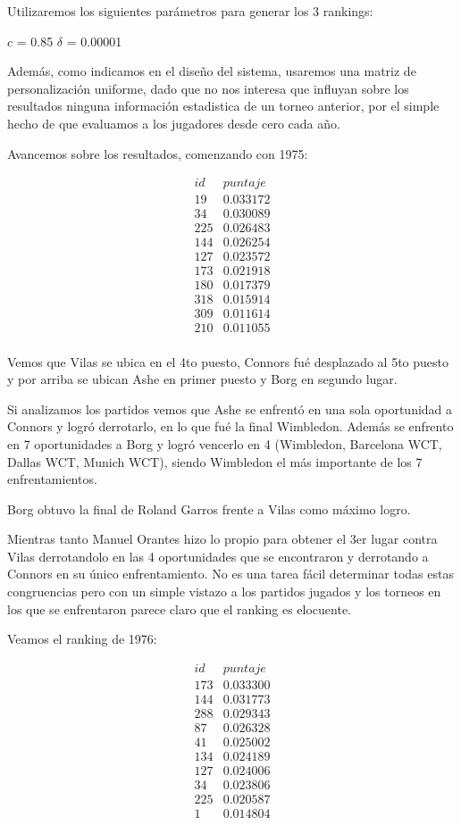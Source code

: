 Utilizaremos los siguientes parámetros para generar los 3 rankings:

$c$ = 0.85
$\delta$ = 0.00001

Además, como indicamos en el diseño del sistema, usaremos una matriz de personalización uniforme, dado que no nos interesa que influyan sobre los resultados ninguna información estadistica de un torneo anterior, por el simple hecho de que evaluamos a los jugadores desde cero cada año.

Avancemos sobre los resultados, comenzando con 1975:

\begin{eqnarray*}
id & puntaje \\
19 & 0.033172 \\
34 & 0.030089 \\
225 & 0.026483 \\
144 & 0.026254 \\
127 & 0.023572 \\
173 & 0.021918 \\
180 & 0.017379 \\
318 & 0.015914 \\
309 & 0.011614 \\
210 & 0.011055 \\
\end{eqnarray*}

Vemos que Vilas se ubica en el 4to puesto, Connors fué desplazado al 5to puesto y por arriba se ubican Ashe en primer puesto y Borg en segundo lugar. 

Si analizamos los partidos vemos que Ashe se enfrentó en una sola oportunidad a Connors y logró derrotarlo, en lo que fué la final Wimbledon. Además se enfrento en 7 oportunidades a Borg y logró vencerlo en 4 (Wimbledon, Barcelona WCT, Dallas WCT, Munich WCT), siendo Wimbledon el más importante de los 7 enfrentamientos.

Borg obtuvo la final de Roland Garros frente a Vilas como máximo logro. 

Mientras tanto Manuel Orantes hizo lo propio para obtener el 3er lugar contra Vilas derrotandolo en las 4 oportunidades que se encontraron y derrotando a Connors en su único enfrentamiento. 
No es una tarea fácil determinar todas estas congruencias pero con un simple vistazo a los partidos jugados y los torneos en los que se enfrentaron parece claro que el ranking es elocuente.

Veamos el ranking de 1976:

\begin{eqnarray*}
id & puntaje \\
173 & 0.033300 \\
144 & 0.031773 \\
288 & 0.029343 \\
87 & 0.026328 \\
41 & 0.025002 \\
134 & 0.024189 \\
127 & 0.024006 \\
34 & 0.023806 \\
225 & 0.020587 \\
1 & 0.014804 \\
\end{eqnarray*}

